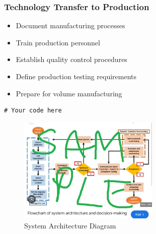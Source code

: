 \subsubsection*{Technology Transfer to Production}
\begin{itemize}
  \item Document manufacturing processes
  \item Train production personnel
  \item Establish quality control procedures
  \item Define production testing requirements
  \item Prepare for volume manufacturing
\end{itemize}


\begin{lstlisting}[style=cstyle, caption=System Architecture Code Example, label=lst:SystemArchitecture10]
# Your code here
\end{lstlisting}

\begin{figure}[htbp] %
    \centering
    \includegraphics[width=0.6\textwidth]{figures/methodology/system_architecture.jpg}
    \caption{System Architecture Diagram}
    \label{fig:system-architecture5}
\end{figure}